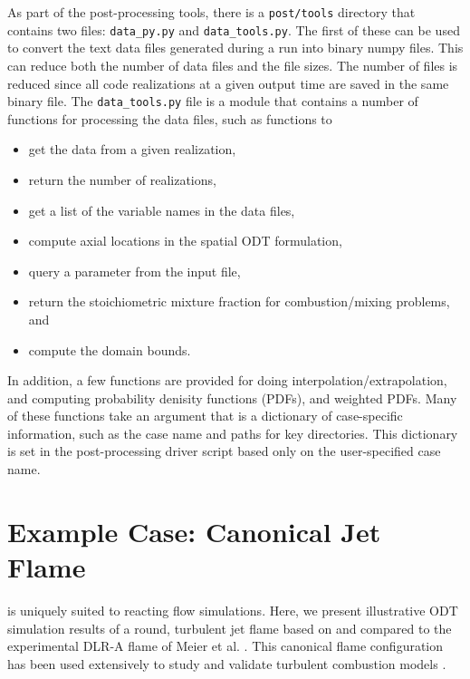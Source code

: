 \documentclass[preprint,12pt, a4paper]{elsarticle}
\begin{document}
As part of the post-processing tools, there is a \texttt{post/tools} directory that contains two files: \texttt{data\_py.py} and \texttt{data\_tools.py}. The first of these can be used to convert the text data files generated during a run into binary numpy files. This can reduce both the number of data files and the file sizes. The number of files is reduced since all code realizations at a given output time are saved in the same binary file. The \texttt{data\_tools.py} file is a module that contains a number of functions for processing the data files, such as functions to
%
\begin{itemize}
    \item get the data from a given realization,
    \item return the number of realizations,
    \item get a list of the variable names in the data files,
    \item compute axial locations in the spatial ODT formulation,
    \item query a parameter from the input file,
    \item return the stoichiometric mixture fraction for combustion/mixing problems, and
    \item compute the domain bounds.
\end{itemize}
%
In addition, a few functions are provided for doing interpolation/extrapolation, and computing probability denisity functions (PDFs), and weighted PDFs.
Many of these functions take an argument that is a dictionary of case-specific information, such as the case name and paths for key directories. This dictionary is set in the post-processing driver script based only on the user-specified case name.


\section{Example Case: Canonical Jet Flame}
\label{sec:examples}

  is uniquely suited to reacting flow simulations. Here, we present illustrative ODT simulation results of a round, turbulent jet flame based on and compared to the experimental DLR-A flame of Meier et al. \cite{Meier_2000}. This canonical flame configuration has been used extensively to study and validate turbulent combustion models \cite{Pitsch_2000,Lindstedt_2005,Wang_2011,Fairweather_2004,Lee_2008,Lee_2009}. 
\end{document}
